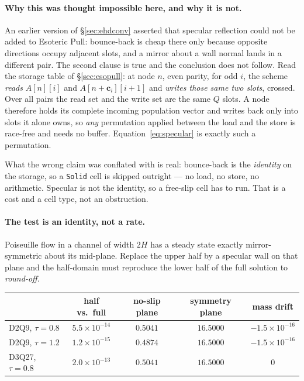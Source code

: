 \documentclass[11pt,a4paper]{article}
\newcommand{\code}[1]{\texttt{\small #1}}
\newcommand{\e}[1]{\times 10^{#1}}
\begin{document}
\paragraph{Why this was thought impossible here, and why it is not.}
An earlier version of \S\ref{sec:ehdconv} asserted that specular reflection could
not be added to Esoteric Pull: bounce-back is cheap there only because opposite
directions occupy adjacent slots, and a mirror about a wall normal lands in a
different pair. The second clause is true and the conclusion does not follow.
Read the storage table of \S\ref{sec:esopull}: at node $n$, even parity, for odd
$i$, the scheme \emph{reads} $A[n][i]$ and $A[n+\bm{c}_i][i{+}1]$ and
\emph{writes those same two slots}, crossed. Over all pairs the read set and the
write set are the same $Q$ slots. A node therefore holds its complete incoming
population vector and writes back only into slots it alone owns, so \emph{any}
permutation applied between the load and the store is race-free and needs no
buffer. Equation~\eqref{eq:specular} is exactly such a permutation.

What the wrong claim was conflated with is real: bounce-back is the
\emph{identity} on the storage, so a \code{Solid} cell is skipped outright --- no
load, no store, no arithmetic. Specular is not the identity, so a free-slip cell
has to run. That is a cost and a cell type, not an obstruction.

\paragraph{The test is an identity, not a rate.} Poiseuille flow in a channel of
width $2H$ has a steady state exactly mirror-symmetric about its mid-plane.
Replace the upper half by a specular wall on that plane and the half-domain must
reproduce the lower half of the full solution to \emph{round-off}.

\begin{center}\small
\begin{tabular}{lcccc}
\toprule
 & half vs.\ full & no-slip plane & symmetry plane & mass drift \\
\midrule
D2Q9, $\tau=0.8$  & $5.5\e{-14}$ & $0.5041$ & $16.5000$ & $-1.5\e{-16}$ \\
D2Q9, $\tau=1.2$  & $1.2\e{-15}$ & $0.4874$ & $16.5000$ & $-1.5\e{-16}$ \\
D3Q27, $\tau=0.8$ & $2.0\e{-13}$ & $0.5041$ & $16.5000$ & $0$ \\
\bottomrule
\end{tabular}
\end{center}
\end{document}
